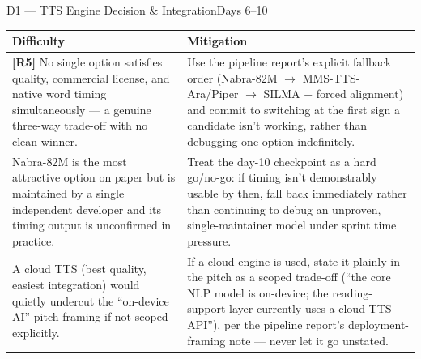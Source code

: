 \documentclass[11pt,a4paper]{article}
\begin{document}
\begin{milestonehead}{D1 --- TTS Engine Decision \& Integration}{Days 6--10}
\begin{center}
\small
\begin{tabular}{@{}p{6.3cm}p{6.9cm}@{}}
\toprule
\textbf{Difficulty} & \textbf{Mitigation} \\
\midrule
\textbf{[R5]} No single option satisfies quality, commercial license, and
native word timing simultaneously --- a genuine three-way trade-off with no
clean winner. & Use the pipeline report's explicit fallback order (Nabra-82M
$\to$ MMS-TTS-Ara/Piper $\to$ SILMA + forced alignment) and commit to
switching at the first sign a candidate isn't working, rather than debugging
one option indefinitely. \\
\addlinespace
Nabra-82M is the most attractive option on paper but is maintained by a
single independent developer and its timing output is unconfirmed in
practice. & Treat the day-10 checkpoint as a hard go/no-go: if timing isn't
demonstrably usable by then, fall back immediately rather than continuing
to debug an unproven, single-maintainer model under sprint time pressure. \\
\addlinespace
A cloud TTS (best quality, easiest integration) would quietly undercut the
``on-device AI'' pitch framing if not scoped explicitly. & If a cloud engine
is used, state it plainly in the pitch as a scoped trade-off (``the core NLP
model is on-device; the reading-support layer currently uses a cloud TTS
API''), per the pipeline report's deployment-framing note --- never let it
go unstated. \\
\bottomrule
\end{tabular}
\end{center}
\end{milestonehead}
\end{document}
